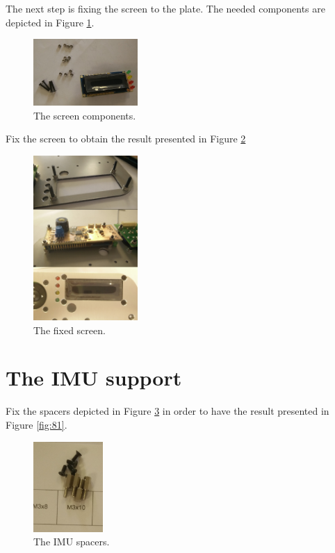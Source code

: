 \documentclass[10pt,a4paper]{report}   %
\begin{document}
The next step is fixing the screen to the plate. The needed components are depicted in Figure \ref{fig:78}.

\begin{figure}[H]
\center
\includegraphics[width=150px]{images/78.jpg}
\caption{The screen components.}
\label{fig:78}
\end{figure}

Fix the screen to obtain the result presented in Figure \ref{fig:79}

\begin{figure}[H]
\center
\includegraphics[width=150px]{images/79.jpg}
\caption{The fixed screen.}
\label{fig:79}
\end{figure}

\section{The IMU support}

Fix the spacers depicted in Figure \ref{fig:80} in order to have the result presented in Figure \ref{fig:81}.

\begin{figure}[H]
\center
\includegraphics[width=100px]{images/80.jpg}
\caption{The IMU spacers.}
\label{fig:80}
\end{figure}
\end{document}
